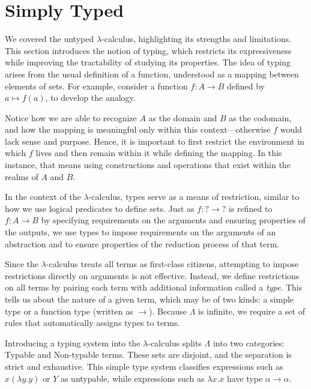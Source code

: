 
\section{\centering Simply Typed \lCalc}

We covered the untyped \(\lambda\)-calculus, highlighting its strengths and limitations. This  
section introduces the notion of typing, which restricts its expressiveness while  
improving the tractability of studying its properties. The idea of typing arises  
from the usual definition of a function, understood as a mapping between elements of sets. For example, consider a function  
\( f : A \to B \) defined by \( a \mapsto f(a) \), to develop the analogy.

Notice how we are able to recognize \(A\) as the domain and \(B\) as the codomain, and how the mapping  
is meaningful only within this context—otherwise \( f \) would lack sense and  
purpose. Hence, it is important to first restrict the environment in which \( f \)  
lives and then remain within it while defining the mapping. In this instance,  
that means using constructions and operations that exist within the realms of  
\(A\) and \(B\).

In the context of the \(\lambda\)-calculus, types serve as a means of restriction, similar  
to how we use logical predicates to define sets. Just as \( f : \mathbf{?} \to \mathbf{?} \) is refined  
to \( f : A \to B \) by specifying requirements on the arguments and ensuring  
properties of the outputs, we use types to impose requirements on the arguments  
of an abstraction and to ensure properties of the reduction process of that term.

Since the \(\lambda\)-calculus treats all terms as first-class citizens, attempting to impose  
restrictions directly on arguments is not effective. Instead, we define restrictions  
on all terms by pairing each term with additional information called a \emph{type}.  
This tells us about the nature of a given term, which may be of two kinds: a simple  
type or a function type (written as \(\to\)). Because \(\Lambda\) is infinite, we require  
a set of rules that automatically assigns types to terms.

Introducing a typing system into the \(\lambda\)-calculus splits \(\Lambda\) into two categories:  
Typable and Non-typable terms. These sets are disjoint, and the separation is strict  
and exhaustive. This simple type system classifies expressions such as  
\( x (\lambda y.y) \) or \( Y \) as untypable, while expressions such as \( \lambda x.x \) have type  
\(\alpha \to \alpha\).

